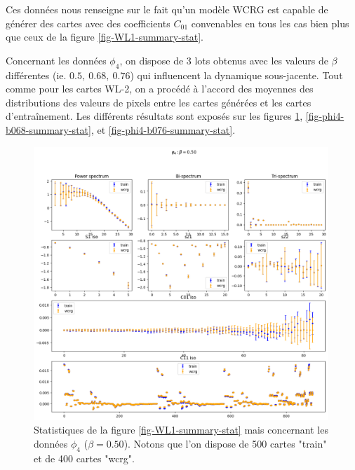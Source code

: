\documentclass[12pt,twoside]{article}
\begin{document}
Ces données nous renseigne sur le fait qu'un modèle WCRG est capable de générer des cartes avec des coefficients $C_{01}$ convenables en tous les cas bien plus que ceux de la figure \ref{fig-WL1-summary-stat}. 

Concernant les données $\phi_4$, on dispose de 3 lots obtenus avec les valeurs de $\beta$ différentes (ie. $0.5,\ 0.68,\ 0.76$) qui influencent la dynamique sous-jacente. Tout comme pour les cartes WL-2, on a procédé à l'accord des moyennes des distributions des valeurs de pixels entre les cartes générées et les  cartes d'entraînement. Les différents résultats sont exposés sur les figures \ref{fig-phi4-b050-summary-stat}, \ref{fig-phi4-b068-summary-stat}, et \ref{fig-phi4-b076-summary-stat}.

\begin{figure}
\centering
\includegraphics[width=0.99\textwidth]{fig-phi4-b050-summary-stat.png}
\caption{Statistiques de la figure \ref{fig-WL1-summary-stat} mais concernant les données $\phi_4$ ($\beta=0.50$).  Notons que l'on dispose de 500 cartes "train" et de 400 cartes "wcrg".}
\label{fig-phi4-b050-summary-stat}
\end{figure}
\end{document}
